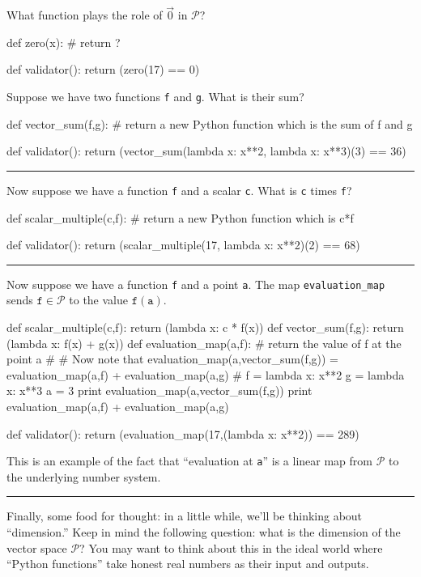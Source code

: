 \documentclass{ximera}
\begin{document}
\begin{question}
  What function plays the role of $\vec{0}$ in $\mathcal{P}$?
  \begin{solution}
    \begin{python}
def zero(x):
  # return ?  
    
def validator():
  return (zero(17) == 0)
    \end{python}
  \end{solution}

  Suppose we have two functions \texttt{f} and \texttt{g}.  What is their sum?
  \begin{solution}
    \begin{python}
def vector_sum(f,g):
  # return a new Python function which is the sum of f and g
    
def validator():
  return (vector_sum(lambda x: x**2, lambda x: x**3)(3) == 36)
    \end{python}
  \end{solution}

  \hrule

  Now suppose we have a function \texttt{f} and a scalar \texttt{c}.  What is \texttt{c} times \texttt{f}?
  \begin{solution}
    \begin{python}
def scalar_multiple(c,f):
  # return a new Python function which is c*f
    
def validator():
  return (scalar_multiple(17, lambda x: x**2)(2) == 68)
    \end{python}
  \end{solution}

  \hrule

    Now suppose we have a function \texttt{f} and a point \texttt{a}.  The map \texttt{evaluation\_map} sends $\texttt{f} \in \mathcal{P}$ to the value $\texttt{f}(\texttt{a})$.
  \begin{solution}
    \begin{python}
def scalar_multiple(c,f):
  return (lambda x: c * f(x))
def vector_sum(f,g):
  return (lambda x: f(x) + g(x))
def evaluation_map(a,f):
  # return the value of f at the point a
#
# Now note that evaluation_map(a,vector_sum(f,g)) = evaluation_map(a,f) + evaluation_map(a,g)
#
f = lambda x: x**2
g = lambda x: x**3
a = 3
print evaluation_map(a,vector_sum(f,g))
print evaluation_map(a,f) + evaluation_map(a,g)
    
def validator():
  return (evaluation_map(17,(lambda x: x**2)) == 289)
    \end{python}
  \end{solution}

  This is an example of the fact that ``evaluation at \texttt{a}'' is a linear map from $\mathcal{P}$ to the underlying number system.

  \hrule

  Finally, some food for thought: in a little while, we'll be thinking
  about ``dimension.''  Keep in mind the following question: what is
  the dimension of the vector space $\mathcal{P}$?  You may want to
  think about this in the ideal world where ``Python functions'' take
  honest real numbers as their input and outputs.
\end{question}
\end{document}
